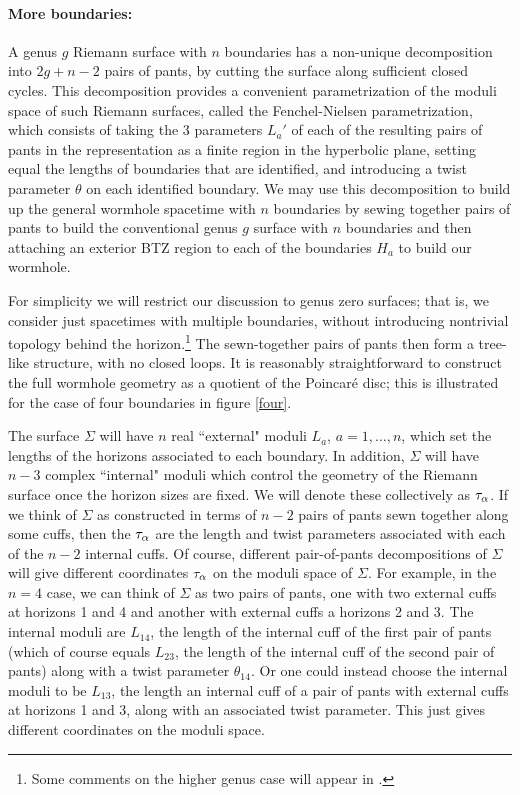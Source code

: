 \documentclass[12pt]{article}
\numberwithin{equation}{section}
\begin{document}
\paragraph{More boundaries:} A genus $g$ Riemann surface with $n$ boundaries has a non-unique decomposition into $2g + n -2$ pairs of pants, by cutting the surface along sufficient closed cycles. This decomposition provides a convenient  parametrization of the moduli space of such Riemann surfaces, called the Fenchel-Nielsen parametrization, which consists of taking the 3 parameters $L_a'$ of each of the resulting pairs of pants in the representation as a finite region in the hyperbolic plane, setting equal the lengths of boundaries that are identified, and introducing a twist parameter $\theta$ on each identified boundary. We may use this decomposition to build up the general wormhole spacetime with $n$ boundaries by sewing together pairs of pants to build the conventional genus $g$ surface with $n$ boundaries and then attaching an exterior BTZ region to each of the boundaries $H_a$ to build our wormhole.

For simplicity we will restrict our discussion to genus zero surfaces; that is, we consider just spacetimes with multiple boundaries, without  introducing nontrivial topology behind the horizon.\footnote{Some comments on the higher genus case will appear in \cite{MRta}.}  The sewn-together pairs of pants then form a tree-like structure, with no closed loops.
It is reasonably straightforward to construct the full wormhole geometry as a quotient of the Poincar\'e disc; this is illustrated for the case of four boundaries in figure \ref{four}.

The surface $\Sigma$ will have $n$ real ``external" moduli $L_a$, $a=1,\dots,n$, which set the lengths of the horizons associated to each boundary.  In addition, $\Sigma$ will have $n-3$ complex ``internal" moduli which control the geometry of the Riemann surface once the horizon sizes are fixed.
We will denote these collectively as $\bf \tau_\alpha$. If we think of $\Sigma$ as constructed in terms of $n-2$ pairs of pants sewn together along some cuffs, then the ${\bf \tau}_\alpha$ are the length and twist parameters associated with each of the $n-2$ internal cuffs.  Of course, different pair-of-pants decompositions of $\Sigma$ will give different coordinates ${\bf \tau}_\alpha$ on the moduli space of $\Sigma$.
For example, in the $n=4$ case, we can think of $\Sigma$ as two pairs of pants, one with two external cuffs at horizons 1 and 4 and another with external cuffs a horizons 2 and 3.  The internal moduli are $L_{14}$, the length of the internal cuff of the first pair of pants (which of course equals $L_{23}$, the length of the internal cuff of the second pair of pants) along with a twist parameter $\theta_{14}$.
Or one could  instead choose the internal moduli to be $L_{13}$, the length an internal cuff of a pair of pants with external cuffs at horizons 1 and 3, along with an associated twist parameter.  This just gives different coordinates on the moduli space.
\end{document}
